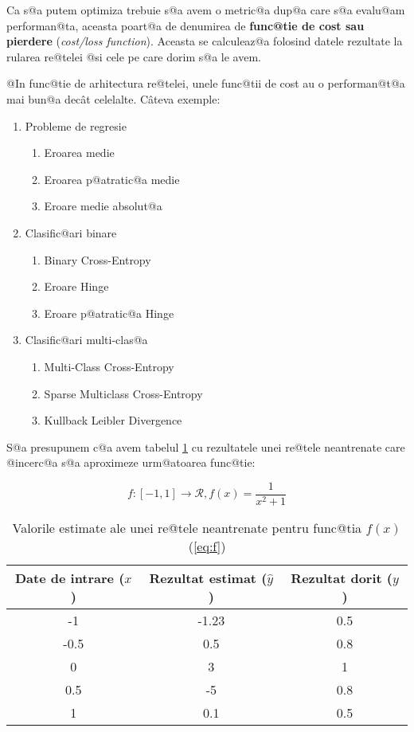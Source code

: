 Ca s@a putem optimiza trebuie s@a avem o metric@a dup@a care s@a evalu@am performan@ta, aceasta poart@a de denumirea de \textbf{func@tie de cost sau pierdere} (\textsl{cost/loss function}). Aceasta se calculeaz@a folosind datele rezultate la rularea re@telei @si cele pe care dorim s@a le avem. 

@In func@tie de arhitectura re@telei, unele func@tii de cost au o performan@t@a mai bun@a dec\^ at celelalte. C\^ ateva exemple:

\begin{enumerate}
	\item Probleme de regresie
	\begin{enumerate}
		\item Eroarea medie
		\item Eroarea p@atratic@a medie
		\item Eroare medie absolut@a
	\end{enumerate}
	\item Clasific@ari binare
	\begin{enumerate}
		\item Binary Cross-Entropy
		\item Eroare Hinge
		\item Eroare p@atratic@a Hinge
	\end{enumerate}
	\item Clasific@ari multi-clas@a
	\begin{enumerate}
		\item Multi-Class Cross-Entropy
		\item Sparse Multiclass Cross-Entropy
		\item Kullback Leibler Divergence
	\end{enumerate}
\end{enumerate}

S@a presupunem c@a avem tabelul \ref{tab:nn-functie} cu rezultatele unei re@tele neantrenate care @incerc@a s@a aproximeze urm@atoarea func@tie:

\begin{equation} \label{eq:f}
	f:[-1, 1]\rightarrow \mathcal{R}, f(x) = \displaystyle\frac{1}{x^2+1}
\end{equation}

\begin{table}[h]
	\begin{center}
		\begin{tabular}{|c|c|c|}
			\hline
			Date de intrare ($x$) & Rezultat estimat ($\hat{y}$) & Rezultat dorit ($y$) \\
			\hline
			-1 & -1.23 & 0.5 \\
			\hline
			-0.5 & 0.5 & 0.8 \\
			\hline
			0 & 3 & 1 \\
			\hline
			0.5 & -5 & 0.8 \\ 
			\hline
			1 & 0.1 & 0.5 \\ 
			\hline
		\end{tabular}
	\end{center}
	\caption{Valorile estimate ale unei re@tele neantrenate pentru func@tia $f(x)$ (\ref{eq:f})}
	\label{tab:nn-functie}
\end{table}

